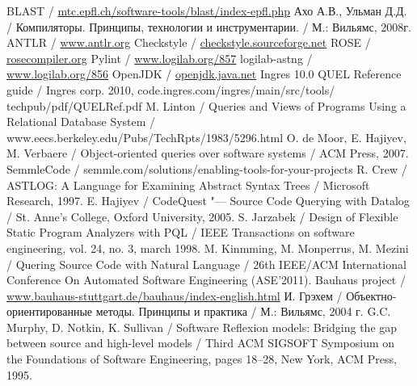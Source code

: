 \documentclass[10pt, a5paper]{article}
\begin{document}
\begin{thebibliography}{99}

BLAST / \url{mtc.epfl.ch/software-tools/blast/index-epfl.php}
Ахо А.В., Ульман Д.Д. / Компиляторы. Принципы, технологии и инструментарии. / М.: Вильямс, 2008г.
ANTLR / \url{www.antlr.org}
Checkstyle / \url{checkstyle.sourceforge.net}
ROSE / \url{rosecompiler.org}
Pylint / \url{www.logilab.org/857}
logilab-astng / \url{www.logilab.org/856}
OpenJDK / \url{openjdk.java.net}
Ingres 10.0 QUEL Reference guide / Ingres corp. 2010, code.ingres.com/ingres/main/src/tools/ techpub/pdf/QUELRef.pdf
M. Linton / Queries and Views of Programs Using a Relational Database System / www.eecs.berkeley.edu/Pubs/TechRpts/1983/5296.html
O. de Moor, E. Hajiyev, M. Verbaere / Object-oriented queries over software systems / ACM Press, 2007.
SemmleCode / semmle.com/solutions/enabling-tools-for-your-projects
R. Crew / ASTLOG: A Language for Examining Abstract Syntax Trees / Microsoft Research, 1997.
E. Hajiyev / CodeQuest "--- Source Code Querying with Datalog / St. Anne’s College, Oxford University, 2005.
S. Jarzabek / Design of Flexible Static Program Analyzers with PQL / IEEE Transactions on software engineering, vol. 24, no. 3, march 1998.
M. Kinmming, M. Monperrus, M. Mezini / Quering Source Code with Natural Language / 26th IEEE/ACM International Conference On Automated Software Engineering (ASE'2011).
Bauhaus project / \url{www.bauhaus-stuttgart.de/bauhaus/index-english.html}
И. Грэхем / Объектно-ориентированные методы. Принципы и практика / М.: Вильямс, 2004 г.
 G.C. Murphy, D. Notkin, K. Sullivan / Software Reflexion models: Bridging the gap between source and high-level models / Third ACM SIGSOFT Symposium on the Foundations of Software Engineering, pages 18--28, New York, ACM Press, 1995.

\end{thebibliography}
\end{document}
